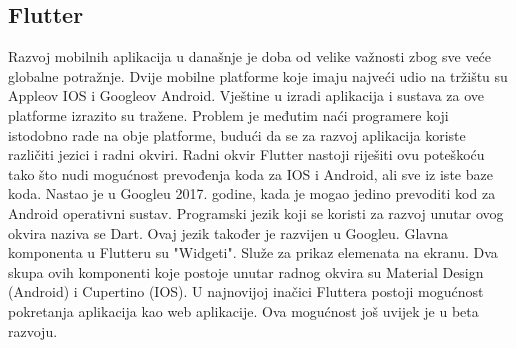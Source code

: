 

\subsection{Flutter}
Razvoj mobilnih aplikacija u današnje je doba od velike važnosti zbog sve veće globalne potražnje. Dvije mobilne platforme koje imaju najveći udio na 
tržištu su Appleov IOS i Googleov Android. Vještine u izradi aplikacija i sustava za ove platforme izrazito su tražene. Problem je međutim naći programere koji
istodobno rade na obje platforme, budući da se za razvoj aplikacija koriste različiti jezici i radni okviri. 
Radni okvir Flutter nastoji riješiti ovu poteškoću tako što nudi mogućnost prevođenja koda za IOS i Android, ali sve iz iste baze koda. 
Nastao je u Googleu 2017. godine, kada je mogao jedino prevoditi kod za Android operativni sustav. Programski jezik koji se koristi za razvoj unutar ovog okvira naziva se Dart. Ovaj jezik također je razvijen u Googleu. 
Glavna komponenta u Flutteru su "Widgeti". Služe za prikaz elemenata na ekranu. Dva skupa ovih komponenti koje postoje unutar radnog 
okvira su Material Design (Android) i Cupertino (IOS).
U najnovijoj inačici Fluttera postoji mogućnost pokretanja aplikacija kao web aplikacije. Ova mogućnost još uvijek je u beta razvoju. 



